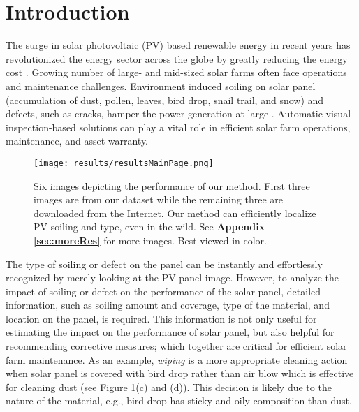 \documentclass[10pt,twocolumn,letterpaper]{article}
\begin{document}
\section{Introduction}
\vspace{-2mm}
The surge in solar photovoltaic (PV) based renewable energy in recent years has revolutionized the energy sector across the globe by greatly reducing the energy cost \cite{usa2020}. Growing number of large- and mid-sized solar farms often face operations and maintenance challenges. Environment induced soiling on solar panel (accumulation of dust, pollen, leaves, bird drop, snail trail, and snow) and defects,  such as cracks, hamper the power generation at large \cite{DustReview,MANI20103124,SoilingPwrLoss,Zapata2015}.  Automatic visual inspection-based solutions can play a vital role in efficient solar farm operations, maintenance, and asset warranty.

\begin{figure}[!t]
\centering
\setlength{\belowcaptionskip}{-4mm}
\texttt{[image: results/resultsMainPage.png]}
\caption{Six images depicting the performance of our method. First three images are from our dataset while the remaining three are downloaded from the Internet. Our method can efficiently localize PV soiling and type, even in the wild. See \textbf{Appendix \ref{sec:moreRes}} for more images. Best viewed in color.}
\label{fig:siximages}
\end{figure}

The type of soiling or defect on the panel can be instantly and effortlessly recognized by merely looking at the PV panel image. However, to analyze the impact of soiling or defect on the performance of the solar panel, detailed information, such as soiling amount and coverage, type of the material, and location on the panel, is required. This information is not only useful for estimating the impact on the performance of solar panel, but also helpful for recommending corrective measures; which together are critical for efficient solar farm maintenance. As an example, \textit{wiping} is a more appropriate cleaning action when solar panel is covered with bird drop rather than air blow which is effective for cleaning dust (see Figure \ref{fig:siximages}(c) and (d)). This decision is likely due to the nature of the material, e.g., bird drop has sticky and oily composition than dust.
\end{document}
